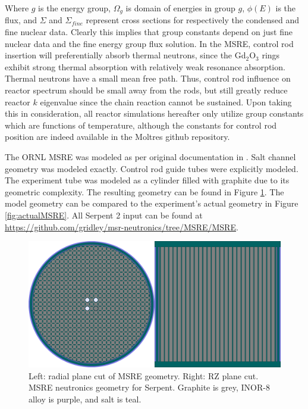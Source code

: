 \documentclass[12pt]{article}
\begin{document}
Where $g$ is the energy group, $\Omega_g$ is domain of energies in group $g$, $\phi(E)$ is the flux, and $\Sigma$ and $\Sigma_{fine}$ represent cross sections for respectively the condensed and fine nuclear data. Clearly this implies that group constants depend on just fine nuclear data and the fine energy group flux solution. In the MSRE, control rod insertion will preferentially absorb thermal neutrons, since the Gd$_2$O$_3$ rings exhibit strong thermal absorption with relatively weak resonance absorption. Thermal neutrons have a small mean free path. Thus, control rod influence on reactor spectrum should be small away from the rods, but still greatly reduce reactor $k$ eigenvalue since the chain reaction cannot be sustained. Upon taking this in consideration, all reactor simulations hereafter only utilize group constants which are functions of temperature, although the constants for control rod position are indeed available in the Moltres github repository.

The ORNL MSRE was modeled as per original documentation in \cite{robertson_msre}. Salt channel geometry was modeled exactly. Control rod guide tubes were explicitly modeled. The experiment tube was modeled as a cylinder filled with graphite due to its geometric complexity. The resulting geometry can be found in Figure \ref{fig:msreGeometry}. The model geometry can be compared to the experiment's actual geometry in Figure \ref{fig:actualMSRE}. All Serpent 2 input can be found at \url{https://github.com/gridley/msr-neutronics/tree/MSRE/MSRE}. 

\begin{figure}[ht]
\includegraphics[width=\textwidth]{msreSerpGeom.png}
\caption{Left: radial plane cut of MSRE geometry. Right: RZ plane cut. MSRE neutronics geometry for Serpent. Graphite is grey, INOR-8 alloy is purple, and salt is teal.}
\label{fig:msreGeometry}
\end{figure}
\end{document}
